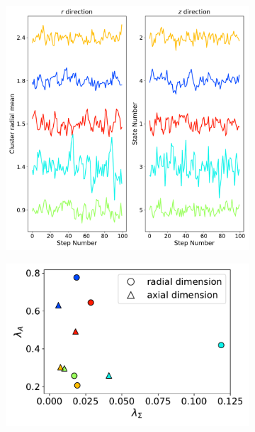 \documentclass{article}
\begin{document}
  \begin{figure}
  \centering
  \begin{subfigure}{0.58\textwidth}
  \includegraphics[width=\textwidth]{common_states.pdf}
  \caption{}\label{fig:common_states_lines}
  \end{subfigure}
  \begin{subfigure}{0.41\textwidth}
  \includegraphics[width=\textwidth]{A_sigma_scatter.pdf}
  \caption{}\label{fig:A_sigma_scatter}

\end{subfigure}
\end{figure}
\end{document}
